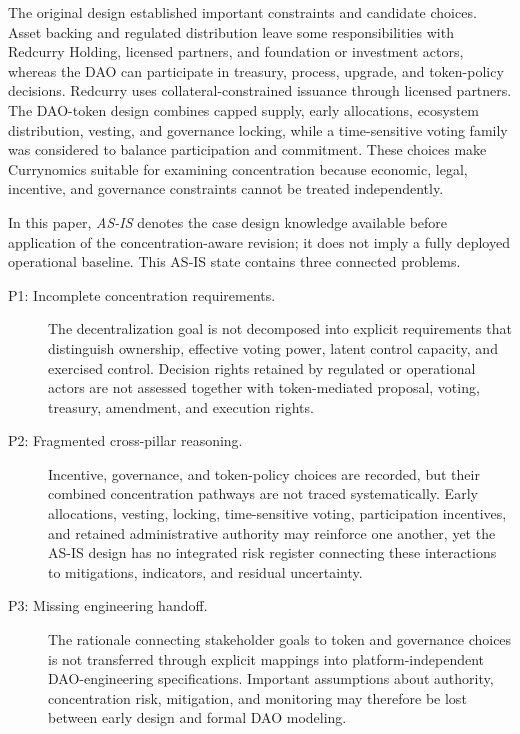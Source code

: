 \documentclass[referee,sn-basic]{sn-jnl}
\begin{document}
The original design established important constraints and candidate choices.
Asset backing and regulated distribution leave some responsibilities with
Redcurry Holding, licensed partners, and foundation or investment actors,
whereas the DAO can participate in treasury, process, upgrade, and token-policy
decisions. Redcurry uses collateral-constrained issuance through licensed
partners. The DAO-token design combines capped supply, early allocations,
ecosystem distribution, vesting, and governance locking, while a time-sensitive
voting family was considered to balance participation and commitment. These
choices make Currynomics suitable for examining concentration because economic,
legal, incentive, and governance constraints cannot be treated independently.

In this paper, \emph{AS-IS} denotes the case design knowledge available before
application of the concentration-aware revision; it does not imply a fully
deployed operational baseline. This AS-IS state contains three connected
problems.

\begin{description}
  \item[P1: Incomplete concentration requirements.] The decentralization goal
  is not decomposed into explicit requirements that distinguish ownership,
  effective voting power, latent control capacity, and exercised control.
  Decision rights retained by regulated or operational actors are not assessed
  together with token-mediated proposal, voting, treasury, amendment, and
  execution rights.

  \item[P2: Fragmented cross-pillar reasoning.] Incentive, governance, and
  token-policy choices are recorded, but their combined concentration pathways
  are not traced systematically. Early allocations, vesting, locking,
  time-sensitive voting, participation incentives, and retained administrative
  authority may reinforce one another, yet the AS-IS design has no integrated
  risk register connecting these interactions to mitigations, indicators, and
  residual uncertainty.

  \item[P3: Missing engineering handoff.] The rationale connecting stakeholder
  goals to token and governance choices is not transferred through explicit
  mappings into platform-independent DAO-engineering specifications. Important
  assumptions about authority, concentration risk, mitigation, and monitoring
  may therefore be lost between early design and formal DAO modeling.
\end{description}
\end{document}
